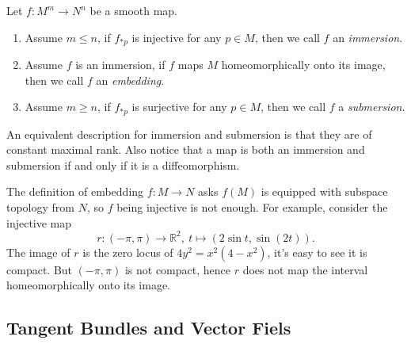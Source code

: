 \begin{defn}
    Let $f:M^m\to N^n$ be a smooth map.
    \begin{enumerate}[(1)]
        \item Assume $m\leq n$, if $f_{*p}$ is injective for any $p\in M$, then we call $f$ an \emph{immersion}.
        \item Assume $f$ is an immersion, if $f$ maps $M$ homeomorphically onto its image, then we call $f$ an \emph{embedding}.
        \item Assume $m\geq n$, if $f_{*p}$ is surjective for any $p\in M$, then we call $f$ a \emph{submersion}.
    \end{enumerate}
\end{defn}

\begin{rem}
    An equivalent description for immersion and submersion is that they are of constant maximal rank.
    Also notice that a map is both an immersion and submersion if and only if it is a diffeomorphism.
\end{rem}

\begin{eg}
    The definition of embedding $f:M\to N$ asks $f(M)$ is equipped with subspace topology from $N$, so $f$ being injective is not enough.
    For example, consider the injective map
    \[r:(-\pi,\pi)\to\mathbb{R}^2,\ t\mapsto(2\sin{t},\sin(2t)).\]
    The image of $r$ is the zero locus of $4y^2=x^2(4-x^2)$, it's easy to see it is compact.
    But $(-\pi,\pi)$ is not compact, hence $r$ does not map the interval homeomorphically onto its image.
\end{eg}

\subsection*{Tangent Bundles and Vector Fiels}

